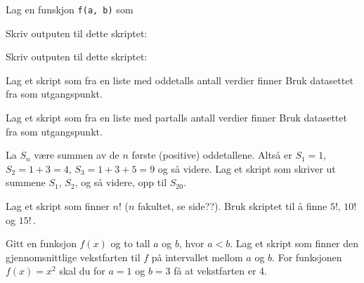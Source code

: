 




\opgt
{}
Lag en funskjon \texttt{f(a, b)} som


Skriv outputen til dette skriptet:

Skriv outputen til dette skriptet:

	
Lag et skript som fra en liste med oddetalls antall verdier finner \os
{} \os
Bruk datasettet fra  som utgangspunkt.

\newpage
{}
Lag et skript som fra en liste med partalls antall verdier finner \os
{} \os
Bruk datasettet fra  som utgangspunkt.

La $S_n$ være summen av de $n$ første (positive) oddetallene. Altså er $S_1=1$, $S_2=1+3=4$, $S_3=1+3+5=9$ og så videre.
Lag et skript som skriver ut summene $S_1$, $S_2$, og så videre, opp til $S_{20}$.

Lag et skript som finner $n!$ ($n$ fakultet, se side??). Bruk skriptet til å finne $5!$, $10!$ og $15!$\,.

Gitt en funksjon $f(x)$ og to tall $a$ og $b$, hvor $a<b$.
Lag et skript som finner den gjennomsnittlige vekstfarten til $f$ på intervallet mellom $a$ og $b$. For funksjonen ${f(x)=x^2}$ skal du for ${a=1}$ og ${b=3}$ få at vekstfarten er 4.

